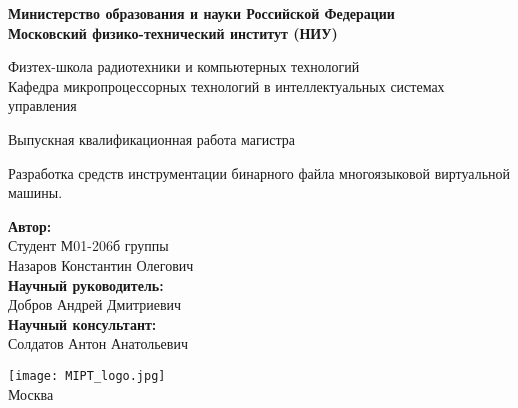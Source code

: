 \begin{center}
    \large\textbf{Министерство образования и науки Российской Федерации \\
    Московский физико-технический институт (НИУ)} \\
    \vspace{1cm}

    Физтех-школа радиотехники и компьютерных технологий \\

    Кафедра микропроцессорных технологий в интеллектуальных системах управления \\

    \vspace{3em}

    Выпускная квалификационная работа магистра
\end{center}

\begin{center}
    \vspace{\fill}
    \LARGE{Разработка средств инструментации бинарного файла многоязыковой виртуальной машины.}

    \vspace{\fill}
\end{center}


\begin{flushright}
    \textbf{Автор:} \\
    Студент М01-206б группы \\
    Назаров Константин Олегович \\
    \vspace{2em}
    \textbf{Научный руководитель:} \\
    Добров Андрей Дмитриевич  \\
    \vspace{2em}
    \textbf{Научный консультант:} \\
    Солдатов Антон Анатольевич \\
\end{flushright}

\vspace{7em}

\begin{center}
    \texttt{[image: MIPT\_logo.jpg]}\\
    Москва \the\year{}
\end{center}

\thispagestyle{empty}

\newpage
\setcounter{page}{2}
\fancyfoot[c]{\thepage}
\fancyhead[R]{}